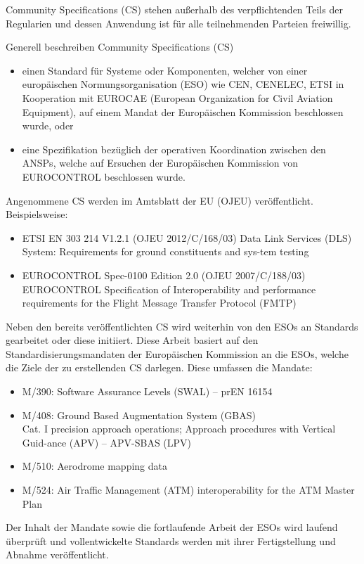        Community Specifications (CS) stehen außerhalb des verpflichtenden Teils der Regularien und dessen Anwendung ist für alle teilnehmenden Parteien freiwillig. 
    
    Generell beschreiben Community Specifications (CS)
    
    \begin{itemize}
        \item einen Standard für Systeme oder Komponenten, welcher von einer europäischen Normungsorganisation (ESO) wie CEN, CENELEC, ETSI in Kooperation mit EUROCAE (European Organization for Civil Aviation Equipment), auf einem Mandat der Europäischen Kommission beschlossen wurde, oder
        \item eine Spezifikation bezüglich der operativen Koordination zwischen den ANSPs, welche auf Ersuchen der Europäischen Kommission von EUROCONTROL beschlossen wurde.
    \end{itemize}
    
Angenommene CS werden im Amtsblatt der EU (OJEU) veröffentlicht.
Beispielsweise:

\begin{itemize}
    \item ETSI EN 303 214 V1.2.1 (OJEU 2012/C/168/03) Data Link Services (DLS) System: Requirements for ground constituents and sys-tem testing
    \item EUROCONTROL Spec-0100 Edition 2.0 (OJEU 2007/C/188/03)
    EUROCONTROL Specification of Interoperability and performance requirements for the Flight Message Transfer Protocol (FMTP)
\end{itemize}

Neben den bereits veröffentlichten CS wird weiterhin von den ESOs an Standards gearbeitet oder diese initiiert. Diese Arbeit basiert auf den Standardisierungsmandaten der Europäischen Kommission an die ESOs, welche die Ziele der zu erstellenden CS darlegen.
Diese umfassen die Mandate:
\begin{itemize}
    \item M/390: Software Assurance Levels (SWAL) – prEN 16154
    \item M/408: Ground Based Augmentation System (GBAS) \\
    Cat. I precision approach operations; Approach procedures with Vertical Guid-ance (APV) – APV-SBAS (LPV)
    \item M/510: Aerodrome mapping data
    \item M/524: Air Traffic Management (ATM) interoperability for the ATM Master Plan
\end{itemize}

Der Inhalt der Mandate sowie die fortlaufende Arbeit der ESOs wird laufend überprüft und vollentwickelte Standards werden mit ihrer Fertigstellung und Abnahme veröffentlicht.
